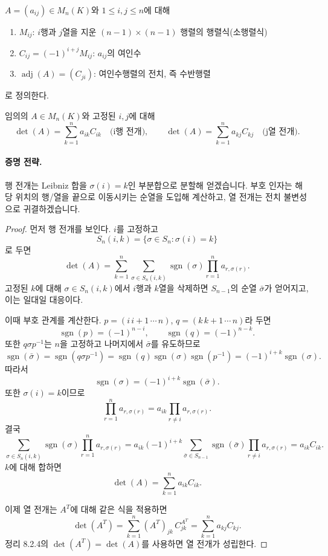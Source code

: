 \begin{definition}
$A=(a_{ij})\in M_n(K)$와 $1\le i,j\le n$에 대해
\begin{enumerate}[label=(\roman*)]
\item $M_{ij}$: $i$행과 $j$열을 지운 $(n-1)\times(n-1)$ 행렬의 행렬식(소행렬식)
\item $C_{ij}=(-1)^{i+j}M_{ij}$: $a_{ij}$의 여인수
\item $\operatorname{adj}(A)=(C_{ji})$: 여인수행렬의 전치, 즉 수반행렬
\end{enumerate}
로 정의한다.
\end{definition}

\begin{theorem}[Laplace 전개]
임의의 $A\in M_n(K)$와 고정된 $i,j$에 대해
$$
\det(A)=\sum_{k=1}^n a_{ik}C_{ik}
\quad\text{(i행 전개)},
\qquad
\det(A)=\sum_{k=1}^n a_{kj}C_{kj}
\quad\text{(j열 전개)}.
$$
\end{theorem}

\paragraph{증명 전략.}
행 전개는 Leibniz 합을 $\sigma(i)=k$인 부분합으로 분할해 얻겠습니다. 부호 인자는 해당 위치의 행/열을 끝으로 이동시키는 순열을 도입해 계산하고, 열 전개는 전치 불변성으로 귀결하겠습니다.

\begin{proof}
먼저 행 전개를 보인다. $i$를 고정하고
$$
S_n(i,k)=\{\sigma\in S_n:\sigma(i)=k\}
$$
로 두면
$$
\det(A)=\sum_{k=1}^n\sum_{\sigma\in S_n(i,k)}
\operatorname{sgn}(\sigma)\prod_{r=1}^n a_{r,\sigma(r)}.
$$
고정된 $k$에 대해 $\sigma\in S_n(i,k)$에서 $i$행과 $k$열을 삭제하면 $S_{n-1}$의 순열 $\bar\sigma$가 얻어지고, 이는 일대일 대응이다.

이때 부호 관계를 계산한다. $p=(i\,i+1\,\cdots\,n)$, $q=(k\,k+1\,\cdots\,n)$라 두면
$$
\operatorname{sgn}(p)=(-1)^{n-i},\qquad
\operatorname{sgn}(q)=(-1)^{n-k}.
$$
또한 $q\sigma p^{-1}$는 $n$을 고정하고 나머지에서 $\bar\sigma$를 유도하므로
$$
\operatorname{sgn}(\bar\sigma)=\operatorname{sgn}(q\sigma p^{-1})
=\operatorname{sgn}(q)\operatorname{sgn}(\sigma)\operatorname{sgn}(p^{-1})
=(-1)^{i+k}\operatorname{sgn}(\sigma).
$$
따라서
$$
\operatorname{sgn}(\sigma)=(-1)^{i+k}\operatorname{sgn}(\bar\sigma).
$$
또한 $\sigma(i)=k$이므로
$$
\prod_{r=1}^n a_{r,\sigma(r)}
=a_{ik}\prod_{r\ne i}a_{r,\sigma(r)}.
$$
결국
$$
\sum_{\sigma\in S_n(i,k)}\operatorname{sgn}(\sigma)\prod_{r=1}^n a_{r,\sigma(r)}
=a_{ik}(-1)^{i+k}\!\!\sum_{\bar\sigma\in S_{n-1}}\operatorname{sgn}(\bar\sigma)\prod_{r\ne i}a_{r,\sigma(r)}
=a_{ik}C_{ik}.
$$
$k$에 대해 합하면
$$
\det(A)=\sum_{k=1}^n a_{ik}C_{ik}.
$$

이제 열 전개는 $A^T$에 대해 같은 식을 적용하면
$$
\det(A^T)=\sum_{k=1}^n (A^T)_{jk}\,C^{A^T}_{jk}
=\sum_{k=1}^n a_{kj}C_{kj}.
$$
정리 8.2.4의 $\det(A^T)=\det(A)$를 사용하면 열 전개가 성립한다.
\end{proof}

